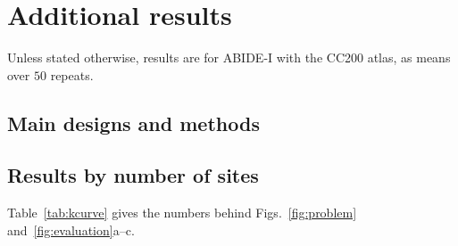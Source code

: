 \section{Additional results}\label{app:more}

Unless stated otherwise, results are for ABIDE-I with the CC200 atlas, as means over $50$ repeats.

\subsection{Main designs and methods}

\begin{table}[h]
\centering
\caption{Training data and training objective of the main designs and methods, for $k=2$, $m=20$ and $b=5$ (cases/controls contributed by each training site). Sites 1 and 2 are the case sites and sites 3 and 4 the control sites of the class-pure design. Pooled LR: $\ell_2$-penalized logistic regression on all training participants.}
\label{tab:designs}
\setlength{\tabcolsep}{3pt}
\end{table}

\subsection{Results by number of sites}

Table~\ref{tab:kcurve} gives the numbers behind Figs.~\ref{fig:problem} and~\ref{fig:evaluation}a--c.

